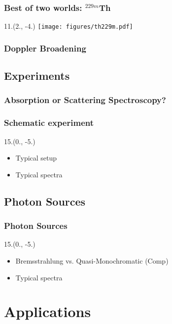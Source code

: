 \documentclass{beamer}
\begin{document}
\begin{frame}
    \frametitle{Best of two worlds: $^{229m}$Th}
    \begin{textblock}{11.}(2., -4.)
        \texttt{[image: figures/th229m.pdf]}
    \end{textblock}
\end{frame}

\begin{frame}
    \frametitle{Doppler Broadening}
    
\end{frame}

\subsection{Experiments}

\begin{frame}
    \frametitle{Absorption or Scattering Spectroscopy?}
    
\end{frame}

\begin{frame}
    \frametitle{Schematic experiment}
    \begin{textblock}{15.}(0., -5.)
        \begin{itemize}
            \item Typical setup
            \item Typical spectra
        \end{itemize}
    \end{textblock}
\end{frame}

\subsection{Photon Sources}

\begin{frame}
    \frametitle{Photon Sources}
    \begin{textblock}{15.}(0., -5.)
        \begin{itemize}
            \item Bremsstrahlung vs. Quasi-Monochromatic (Comp)
            \item Typical spectra
        \end{itemize}
    \end{textblock}
\end{frame}

\section{Applications}
\end{document}
